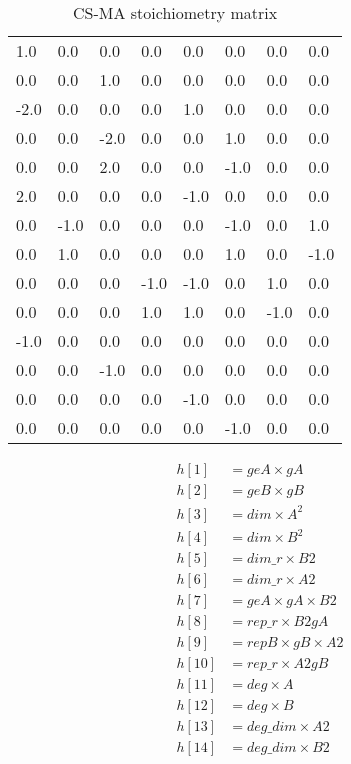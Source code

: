 \begin{table}[tb]
\centering
\caption{CS-MA stoichiometry matrix}
\begin{tabular}{@{}llllllll@{}}

    1.0  &  0.0&    0.0&    0.0&    0.0&    0.0&    0.0&    0.0 \\ 
    0.0   & 0.0 &   1.0 &   0.0 &   0.0 &   0.0 &   0.0 &   0.0\\
    -2.0   & 0.0 &   0.0 &   0.0 &   1.0 &   0.0 &   0.0 &   0.0\\
    0.0    &0.0   & -2.0  &  0.0  &  0.0  &  1.0  &  0.0  &  0.0\\
    0.0    &0.0    &2.0    &0.0    &0.0    &-1.0   & 0.0   & 0.0\\
    2.0    &0.0&    0.0&    0.0&    -1.0    &0.0    &0.0    &0.0\\
    0.0    &-1.0&    0.0&    0.0&    0.0&    -1.0    &0.0    &1.0\\
    0.0    &1.0  &  0.0 &  0.0  &  0.0  &  1.0 &   0.0&    -1.0\\
    0.0    &0.0   & 0.0   & -1.0  &  -1.0 &   0.0&    1.0&    0.0\\
    0.0    &0.0    &0.0    &1.0    &1.0    &0.0   & -1.0  &  0.0\\
    -1.0   & 0.0&    0.0&    0.0&    0.0    &0.0   & 0.0   & 0.0\\
    0.0    &0.0  &  -1.0 &   0.0 &   0.0&    0.0    &0.0    &0.0\\
    0.0    &0.0   & 0.0   & 0.0   & -1.0 &   0.0&    0.0 &   0.0\\
    0.0    &0.0    &0.0    &0.0    &0.0   & -1.0 &   0.0  &  0.0\\ 

\end{tabular}
\end{table}


\begin{align*}
    h[1] &= geA\times gA\\
    h[2] &= geB\times gB\\
    h[3] &= dim\times A^2\\
    h[4] &= dim\times B^2\\
    h[5] &= dim\_r\times B2\\
    h[6] &= dim\_r\times A2\\
    h[7] &= geA\times gA\times B2\\
    h[8] &= rep\_r\times B2gA\\
    h[9] &= repB\times gB\times A2\\
    h[10] &= rep\_r\times A2gB\\
    h[11] &= deg\times A\\
    h[12] &= deg\times B\\
    h[13] &= deg\_dim\times A2\\
    h[14] &= deg\_dim\times B2
\end{align*}




